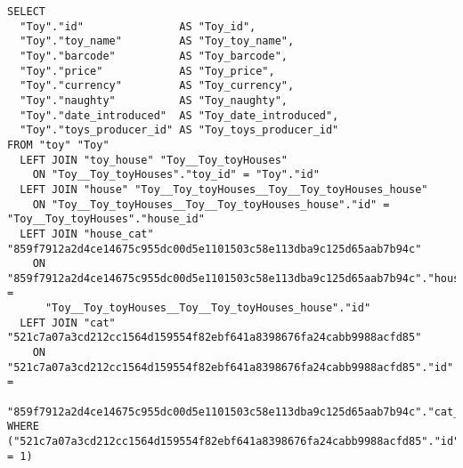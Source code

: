 \begin{listing}
  \label{lst:typeorm-query}
  \caption{}
\begin{verbatim}
SELECT 
  "Toy"."id"               AS "Toy_id",
  "Toy"."toy_name"         AS "Toy_toy_name",
  "Toy"."barcode"          AS "Toy_barcode",
  "Toy"."price"            AS "Toy_price",
  "Toy"."currency"         AS "Toy_currency",
  "Toy"."naughty"          AS "Toy_naughty",
  "Toy"."date_introduced"  AS "Toy_date_introduced",
  "Toy"."toys_producer_id" AS "Toy_toys_producer_id"
FROM "toy" "Toy"
  LEFT JOIN "toy_house" "Toy__Toy_toyHouses" 
    ON "Toy__Toy_toyHouses"."toy_id" = "Toy"."id"
  LEFT JOIN "house" "Toy__Toy_toyHouses__Toy__Toy_toyHouses_house"
    ON "Toy__Toy_toyHouses__Toy__Toy_toyHouses_house"."id" = "Toy__Toy_toyHouses"."house_id"
  LEFT JOIN "house_cat" "859f7912a2d4ce14675c955dc00d5e1101503c58e113dba9c125d65aab7b94c"
    ON "859f7912a2d4ce14675c955dc00d5e1101503c58e113dba9c125d65aab7b94c"."house_id" =
      "Toy__Toy_toyHouses__Toy__Toy_toyHouses_house"."id"
  LEFT JOIN "cat" "521c7a07a3cd212cc1564d159554f82ebf641a8398676fa24cabb9988acfd85"
    ON "521c7a07a3cd212cc1564d159554f82ebf641a8398676fa24cabb9988acfd85"."id" =
      "859f7912a2d4ce14675c955dc00d5e1101503c58e113dba9c125d65aab7b94c"."cat_id"
WHERE ("521c7a07a3cd212cc1564d159554f82ebf641a8398676fa24cabb9988acfd85"."id" = 1)
\end{verbatim}
\end{listing}
